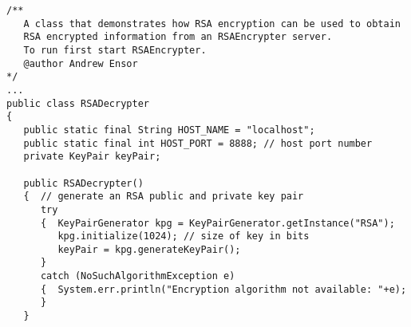 \begin{lstlisting}[caption=RSA encryption]
/**
   A class that demonstrates how RSA encryption can be used to obtain
   RSA encrypted information from an RSAEncrypter server.
   To run first start RSAEncrypter.
   @author Andrew Ensor
*/
...
public class RSADecrypter
{
   public static final String HOST_NAME = "localhost";
   public static final int HOST_PORT = 8888; // host port number
   private KeyPair keyPair;

   public RSADecrypter()
   {  // generate an RSA public and private key pair
      try
      {  KeyPairGenerator kpg = KeyPairGenerator.getInstance("RSA");
         kpg.initialize(1024); // size of key in bits
         keyPair = kpg.generateKeyPair();
      }
      catch (NoSuchAlgorithmException e)
      {  System.err.println("Encryption algorithm not available: "+e);
      }
   }


\end{lstlisting}
